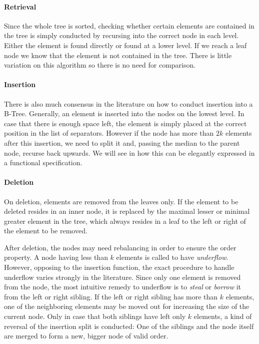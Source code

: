 \paragraph{Retrieval}\label{par:intro-isin}
Since the whole tree is sorted,
checking whether certain elements are contained in the tree
is simply conducted by recursing into the correct node
in each level.
Either the element is found directly or found at a lower level.
If we reach a leaf node we know that the element is not contained in the tree.
There is little variation on this algorithm so there is no need for comparison.

\paragraph{Insertion}\label{par:intro-ins}
There is also much consensus in the literature on how to conduct insertion into a B-Tree.
\parencite{DBLP:journals/csur/Comer79}
Generally, an element is inserted into the nodes on the lowest level.
In case that there is enough space left, the element is simply placed at the correct
position in the list of separators.
However if the node has more than $2k$ elements after this insertion,
we need to split it and, passing the median to the parent node,
recurse back upwards.
We will see in  how this can be
elegantly expressed in a functional specification.

\paragraph{Deletion}\label{par:intro-del}
On deletion, elements are removed from the leaves only.
If the element to be deleted resides in an inner node,
it is replaced by the maximal lesser or minimal greater
element in the tree, which always resides in a leaf
to the left or right of the element to be removed.

After deletion, the nodes may need rebalancing in order
to ensure the order property.
A node having less than $k$ elements is called to have \textit{underflow}.
However, opposing to the insertion function,
the exact procedure to handle underflow varies strongly in the literature.
Since only one element is removed from the node,
the most intuitive remedy to underflow is to \textit{steal} or \textit{borrow} it
from the left or right sibling.\parencite{DBLP:books/daglib/0023376}
If the left or right sibling has more than $k$ elements,
one of the neighboring elements may be moved out for increasing
the size of the current node.
Only in case that both siblings have left only $k$ elements,
a kind of reversal of the insertion split is conducted:
One of the siblings and the node itself are merged to form
a new, bigger node of valid order.

